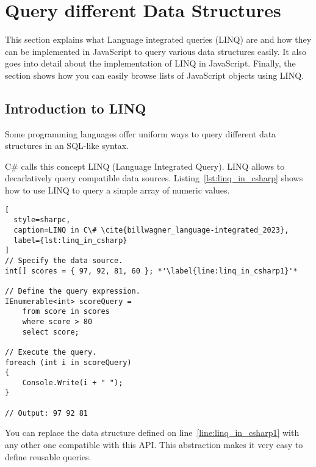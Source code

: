 \section{Query different Data Structures}
\label{sec:Query different Data Structures}
This section explains what Language integrated queries (LINQ) are and how they
can be implemented in JavaScript to query various data structures easily. It
also goes into detail about the implementation of LINQ in JavaScript. Finally,
the section shows how you can easily browse lists of JavaScript objects using
LINQ.
\subsection{Introduction to LINQ} %
\label{sub:Introduction to LINQ}
Some programming languages offer uniform ways to query different data
structures in an SQL-like syntax.

C\# calls this concept LINQ (Language Integrated Query). LINQ allows to
decarlatively query compatible data sources. Listing~\ref{lst:linq_in_csharp}
shows how to use LINQ to query a simple array of numeric values.

\begin{lstlisting}[
  style=sharpc,
  caption=LINQ in C\# \cite{billwagner_language-integrated_2023},
  label={lst:linq_in_csharp}
]
// Specify the data source.
int[] scores = { 97, 92, 81, 60 }; *'\label{line:linq_in_csharp1}'*

// Define the query expression.
IEnumerable<int> scoreQuery =
    from score in scores
    where score > 80
    select score;

// Execute the query.
foreach (int i in scoreQuery)
{
    Console.Write(i + " ");
}

// Output: 97 92 81
\end{lstlisting}

You can replace the data structure defined on line~\ref{line:linq_in_csharp1}
with any other one compatible with this API. This abstraction makes it very
easy to define reusable queries.


